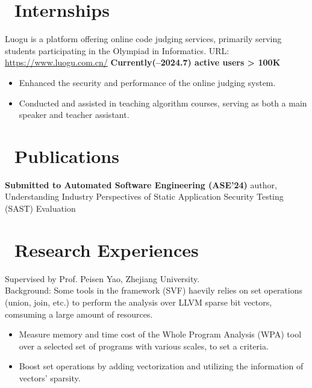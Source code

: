 \documentclass{resume}
\begin{document}
\section{\faUsers\ Internships}
Luogu is a platform offering online code judging services, primarily serving students participating in the Olympiad in Informatics.
URL: \href{https://www.luogu.com.cn/}{https://www.luogu.com.cn/}
\textbf{Currently(--2024.7) active users > 100K} \\
\begin{itemize}
  \item Enhanced the security and performance of the online judging system.
  \item Conducted and assisted in teaching algorithm courses, serving as both a main speaker and teacher assistant.
\end{itemize}

\section{\faBookmarkO\ Publications}
\textbf{Submitted to Automated Software Engineering (ASE'24)}  author, Understanding Industry Perspectives of Static Application Security Testing (SAST) Evaluation

\section{\faSearch\ Research Experiences}
Supervised by Prof. Peisen Yao, Zhejiang University.\\
Background: Some tools in the framework (SVF) haevily relies on set operations (union, join, etc.) to perform the analysis over LLVM sparse bit vectors, comsuming a large amount of resources.
\begin{itemize}
  \item Measure memory and time cost of the Whole Program Analysis (WPA) tool over a selected set of programs with various scales, to set a criteria.
  \item Boost set operations by adding vectorization and utilizing the information of vectors' sparsity.
\end{itemize}
\end{document}
